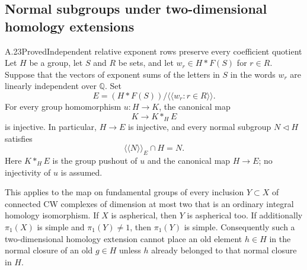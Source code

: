 \subsection{Normal subgroups under two-dimensional homology extensions}

\begin{claim}{A.23}{Proved}{Independent relative exponent rows preserve every coefficient quotient}
Let $H$ be a group, let $S$ and $R$ be sets, and let
$w_r\in H*F(S)$ for $r\in R$. Suppose that the vectors of exponent
sums of the letters in $S$ in the words $w_r$ are linearly
independent over $\mathbb Q$. Set
\[
 E=(H*F(S))/\langle\!\langle w_r:r\in R\rangle\!\rangle.
\]
For every group homomorphism $u:H\to K$, the canonical map
\[
 K\longrightarrow K*_H E
\]
is injective. In particular, $H\to E$ is injective, and every
normal subgroup $N\triangleleft H$ satisfies
\[
 \langle\!\langle N\rangle\!\rangle_E\cap H=N.
 \tag{A.23.1}
\]
Here $K*_H E$ is the group pushout of $u$ and the canonical
map $H\to E$; no injectivity of $u$ is assumed.

This applies to the map on fundamental groups of every inclusion
$Y\subset X$ of connected CW complexes of dimension at most two
that is an ordinary integral homology isomorphism. If $X$ is
aspherical, then $Y$ is aspherical too. If additionally
$\pi_1(X)$ is simple and $\pi_1(Y)\ne1$, then $\pi_1(Y)$ is simple.
Consequently such a two-dimensional homology extension cannot
place an old element $h\in H$ in the normal closure of an old
$g\in H$ unless $h$ already belonged to that normal closure in $H$.
\end{claim}
